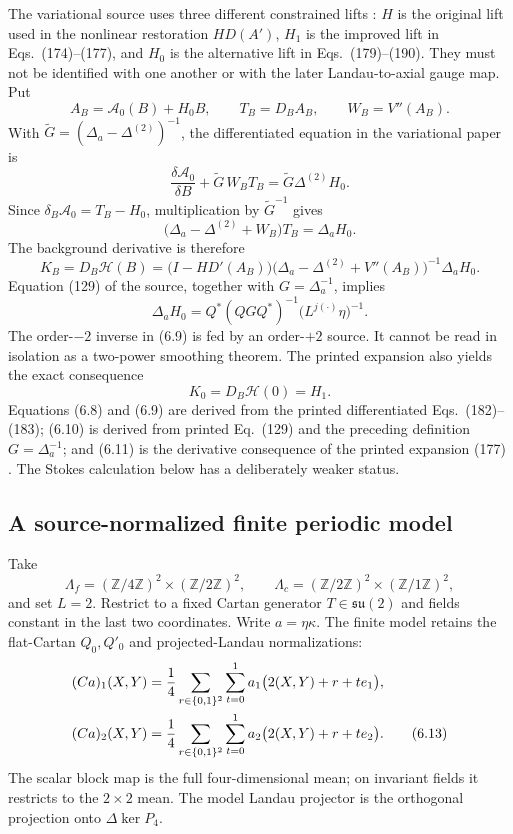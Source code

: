 \documentclass[11pt]{article}
\theoremstyle{definition}
\begin{document}
The variational source uses three different constrained lifts
\cite{balaban1985variational}: \(H\) is the original lift used in the
nonlinear restoration \(HD(A')\), \(H_1\) is the improved lift in
Eqs.~(174)--(177), and \(H_0\) is the alternative lift in
Eqs.~(179)--(190).  They must not be identified with one another or with
the later Landau-to-axial gauge map.  Put
\[
A_B=\mathcal A_0(B)+H_0B,
\qquad
T_B=D_BA_B,
\qquad
W_B=V''(A_B).
\tag{6.6}
\]
With
\(\widetilde G=(\Delta_a-\Delta^{(2)})^{-1}\), the differentiated equation
in the variational paper is
\[
\frac{\delta\mathcal A_0}{\delta B}
+\widetilde G\,W_BT_B
=\widetilde G\Delta^{(2)}H_0.
\tag{6.7}
\]
Since \(\delta_B\mathcal A_0=T_B-H_0\), multiplication by
\(\widetilde G^{-1}\) gives
\[
\bigl(\Delta_a-\Delta^{(2)}+W_B\bigr)T_B
=\Delta_aH_0.
\tag{6.8}
\]
The background derivative is therefore
\[
\boxed{
K_B=D_B\mathcal H(B)
=
\bigl(I-HD'(A_B)\bigr)
\bigl(\Delta_a-\Delta^{(2)}+V''(A_B)\bigr)^{-1}
\Delta_aH_0.
}
\tag{6.9}
\]
Equation (129) of the source, together with
\(G=\Delta_a^{-1}\), implies
\[
\Delta_aH_0
=
Q^*(QGQ^*)^{-1}
\bigl(L^{j(\cdot)}\eta\bigr)^{-1}.
\tag{6.10}
\]
The order-\(-2\) inverse in (6.9) is fed by an order-\(+2\) source.  It
cannot be read in isolation as a two-power smoothing theorem.  The printed
expansion also yields the exact consequence
\[
K_0=D_B\mathcal H(0)=H_1.
\tag{6.11}
\]
Equations (6.8) and (6.9) are derived from the printed differentiated
Eqs.~(182)--(183); (6.10) is derived from printed Eq.~(129) and the
preceding definition \(G=\Delta_a^{-1}\); and (6.11) is the derivative
consequence of the printed expansion (177)
\cite{balaban1985variational}.  The Stokes calculation below has a
deliberately weaker status.

\subsection{A source-normalized finite periodic model}

Take
\[
\Lambda_f=(\mathbb Z/4\mathbb Z)^2
\times(\mathbb Z/2\mathbb Z)^2,
\qquad
\Lambda_c=(\mathbb Z/2\mathbb Z)^2
\times(\mathbb Z/1\mathbb Z)^2,
\tag{6.12}
\]
and set \(L=2\).  Restrict to a fixed Cartan generator \(T\in\mathfrak{su}(2)\)
and fields constant in the last two coordinates.  Write
\(a=\eta\kappa\).  The finite model retains the flat-Cartan \(Q_0,Q'_0\)
and projected-Landau normalizations:
\begin{align}
(Ca)_1(X,Y)
&=\frac14\sum_{r\in\{0,1\}^2}\sum_{t=0}^1
a_1\bigl(2(X,Y)+r+te_1\bigr),
\notag\\
(Ca)_2(X,Y)
&=\frac14\sum_{r\in\{0,1\}^2}\sum_{t=0}^1
a_2\bigl(2(X,Y)+r+te_2\bigr).
\tag{6.13}
\end{align}
The scalar block map is the full four-dimensional mean; on invariant fields
it restricts to the \(2\times2\) mean.  The model Landau projector is the
orthogonal projection onto \(\Delta\ker P_4\).
\end{document}

